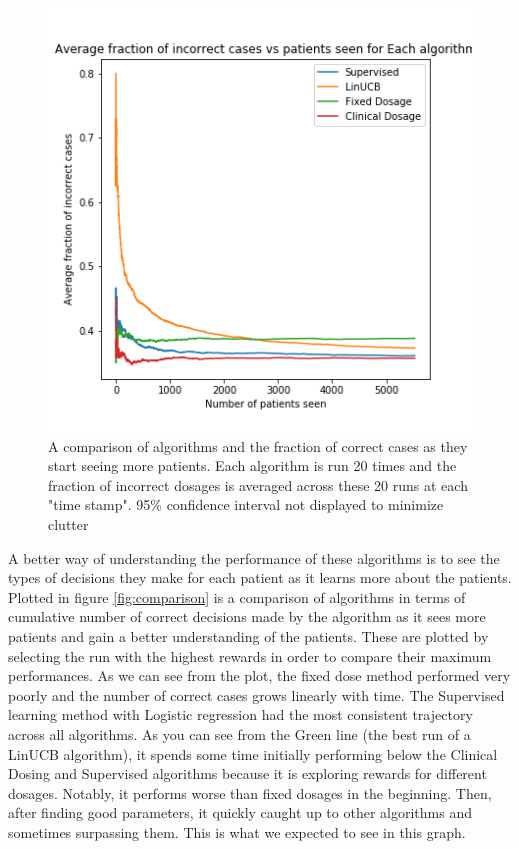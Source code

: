 \documentclass{article}
\begin{document}
\begin{figure}
	\includegraphics[width=\linewidth]{../plots/avg_frac_algos.png}
	\caption{A comparison of algorithms and the fraction of correct cases as they start seeing more patients. Each algorithm is run 20 times and the fraction of incorrect dosages is averaged across these 20 runs at each "time stamp". 95\% confidence interval not displayed to minimize clutter}
	\label{fig:comparison_frac}
\end{figure}

A better way of understanding the performance of these algorithms is to see the types of decisions they make for each patient as it learns more about the patients. Plotted in figure \ref{fig:comparison} is a comparison of algorithms in terms of cumulative number of correct decisions made by the algorithm as it sees more patients and gain a better understanding of the patients. These are plotted by selecting the run with the highest rewards in order to compare their maximum performances. As we can see from the plot, the fixed dose method performed very poorly and the number of correct cases grows linearly with time. The Supervised learning method with Logistic regression had the most consistent trajectory across all algorithms. As you can see from the Green line (the best run of a LinUCB algorithm), it spends some time initially performing below the Clinical Dosing and Supervised algorithms because it is exploring rewards for different dosages. Notably, it performs worse than fixed dosages in the beginning. Then, after finding good parameters, it quickly caught up to other algorithms and sometimes surpassing them. This is what we expected to see in this graph.
\end{document}
